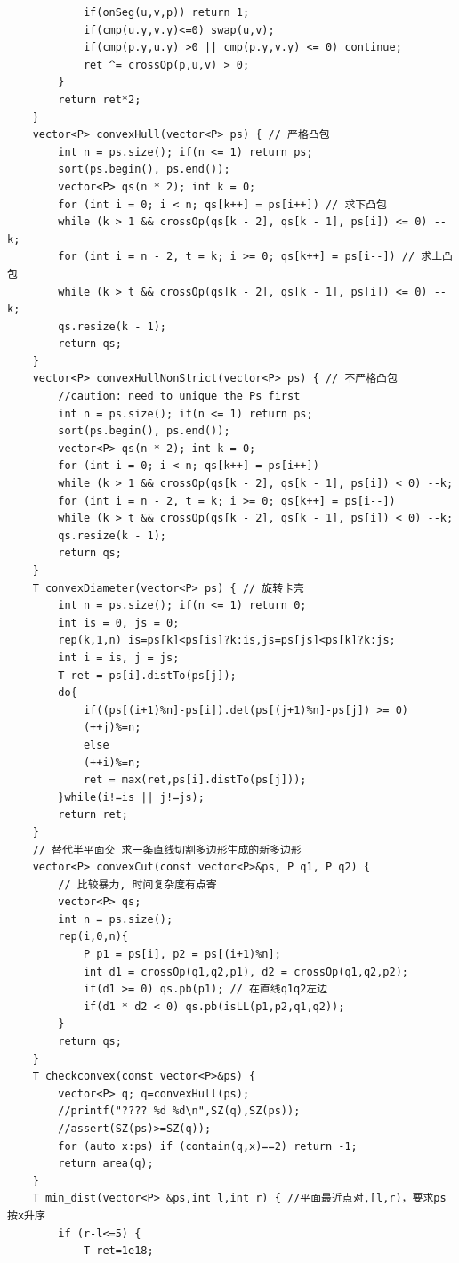 \documentclass[a4paper,12pt]{article}
\begin{document}
\begin{lstlisting}
            if(onSeg(u,v,p)) return 1;
            if(cmp(u.y,v.y)<=0) swap(u,v);
            if(cmp(p.y,u.y) >0 || cmp(p.y,v.y) <= 0) continue;
            ret ^= crossOp(p,u,v) > 0;
        }
        return ret*2;
    }
    vector<P> convexHull(vector<P> ps) { // 严格凸包
        int n = ps.size(); if(n <= 1) return ps;
        sort(ps.begin(), ps.end());
        vector<P> qs(n * 2); int k = 0;
        for (int i = 0; i < n; qs[k++] = ps[i++]) // 求下凸包
        while (k > 1 && crossOp(qs[k - 2], qs[k - 1], ps[i]) <= 0) --k;
        for (int i = n - 2, t = k; i >= 0; qs[k++] = ps[i--]) // 求上凸包
        while (k > t && crossOp(qs[k - 2], qs[k - 1], ps[i]) <= 0) --k;
        qs.resize(k - 1);
        return qs;
    }
    vector<P> convexHullNonStrict(vector<P> ps) { // 不严格凸包
        //caution: need to unique the Ps first
        int n = ps.size(); if(n <= 1) return ps;
        sort(ps.begin(), ps.end());
        vector<P> qs(n * 2); int k = 0;
        for (int i = 0; i < n; qs[k++] = ps[i++])
        while (k > 1 && crossOp(qs[k - 2], qs[k - 1], ps[i]) < 0) --k;
        for (int i = n - 2, t = k; i >= 0; qs[k++] = ps[i--])
        while (k > t && crossOp(qs[k - 2], qs[k - 1], ps[i]) < 0) --k;
        qs.resize(k - 1);
        return qs;
    }
    T convexDiameter(vector<P> ps) { // 旋转卡壳
        int n = ps.size(); if(n <= 1) return 0;
        int is = 0, js = 0;
        rep(k,1,n) is=ps[k]<ps[is]?k:is,js=ps[js]<ps[k]?k:js;
        int i = is, j = js;
        T ret = ps[i].distTo(ps[j]);
        do{
            if((ps[(i+1)%n]-ps[i]).det(ps[(j+1)%n]-ps[j]) >= 0)
            (++j)%=n;
            else
            (++i)%=n;
            ret = max(ret,ps[i].distTo(ps[j]));
        }while(i!=is || j!=js);
        return ret;
    }
    // 替代半平面交 求一条直线切割多边形生成的新多边形
    vector<P> convexCut(const vector<P>&ps, P q1, P q2) {
        // 比较暴力, 时间复杂度有点寄
        vector<P> qs;
        int n = ps.size();
        rep(i,0,n){
            P p1 = ps[i], p2 = ps[(i+1)%n];
            int d1 = crossOp(q1,q2,p1), d2 = crossOp(q1,q2,p2);
            if(d1 >= 0) qs.pb(p1); // 在直线q1q2左边
            if(d1 * d2 < 0) qs.pb(isLL(p1,p2,q1,q2));
        }
        return qs;
    }
    T checkconvex(const vector<P>&ps) {
        vector<P> q; q=convexHull(ps);
        //printf("???? %d %d\n",SZ(q),SZ(ps));
        //assert(SZ(ps)>=SZ(q));
        for (auto x:ps) if (contain(q,x)==2) return -1;
        return area(q);
    }
    T min_dist(vector<P> &ps,int l,int r) { //平面最近点对,[l,r)，要求ps按x升序
        if (r-l<=5) {
            T ret=1e18;

\end{lstlisting}
\end{document}
